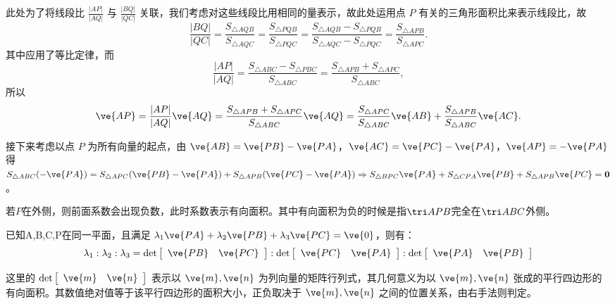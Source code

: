 此处为了将线段比 \(\frac{|AP|}{|AQ|}\) 与 \(\frac{|BQ|}{|QC|}\) 关联，我们考虑对这些线段比用相同的量表示，故此处运用点 \(P\) 有关的三角形面积比来表示线段比，故
\[
\frac{|BQ|}{|QC|} = \frac{S_{\triangle AQB}}{S_{\triangle AQC}} = \frac{S_{\triangle PQB}}{S_{\triangle PQC}} = \frac{S_{\triangle AQB} - S_{\triangle PQB}}{S_{\triangle AQC} - S_{\triangle PQC}} = \frac{S_{\triangle APB}}{S_{\triangle APC}}.
\]
其中应用了等比定律，而
\[
\frac{|AP|}{|AQ|} = \frac{S_{\triangle ABC} - S_{\triangle PBC}}{S_{\triangle ABC}} = \frac{S_{\triangle APB} + S_{\triangle APC}}{S_{\triangle ABC}},
\]
所以
\[
\ve{AP} = \frac{|AP|}{|AQ|} \ve{AQ} = \frac{S_{\triangle APB} + S_{\triangle APC}}{S_{\triangle ABC}} \ve{AQ} = \frac{S_{\triangle APC}}{S_{\triangle ABC}} \ve{AB} + \frac{S_{\triangle APB}}{S_{\triangle ABC}} \ve{AC}.
\]

接下来考虑以点 \(P\) 为所有向量的起点，由 \(\ve{AB} = \ve{PB} - \ve{PA}\)，\(\ve{AC} = \ve{PC} - \ve{PA}\)，\(\ve{AP} = -\ve{PA}\) 得 \(S_{\triangle ABC}(-\ve{PA}) = S_{\triangle APC}(\ve{PB} - \ve{PA}) + S_{\triangle APB}(\ve{PC} - \ve{PA}) \Rightarrow S_{\triangle BPC} \ve{PA} + S_{\triangle CPA} \ve{PB} + S_{\triangle APB} \ve{PC} = \boldsymbol{0}\)。

若\(P\)在外侧，则前面系数会出现负数，此时系数表示有向面积。其中有向面积为负的时候是指\(\tri APB\)完全在\(\tri ABC\)外侧。

\begin{theorem}
    已知A,B,C,P在同一平面，且满足 \(\lambda_1 \ve{PA} + \lambda_2 \ve{PB} + \lambda_3 \ve{PC} = \ve{0}\)，则有：
\[
\lambda_1 : \lambda_2 : \lambda_3 = \mathrm{det} \left[ \begin{array}{cc} \ve{PB} & \ve{PC} \end{array} \right] : \mathrm{det} \left[ \begin{array}{cc} \ve{PC} & \ve{PA} \end{array} \right] : \mathrm{det} \left[ \begin{array}{cc} \ve{PA} & \ve{PB} \end{array} \right]
\]

这里的 \(\text{det} \left[ \begin{array}{cc} \ve{m} & \ve{n} \end{array} \right]\) 表示以 \(\ve{m}, \ve{n}\) 为列向量的矩阵行列式，其几何意义为以 \(\ve{m}, \ve{n}\) 张成的平行四边形的有向面积。其数值绝对值等于该平行四边形的面积大小，正负取决于 \(\ve{m}, \ve{n}\) 之间的位置关系，由右手法则判定。


\end{theorem}

